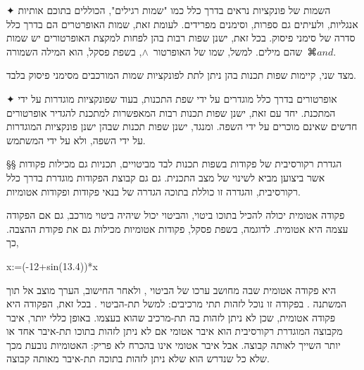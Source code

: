✦ השמות של פונקציות נראים בדרך כלל כמו "שמות רגילים", הכוללים בתוכם אותיות
אנגליות, ולעיתים גם ספרות, וסימנים מפרידים. לעומת זאת, שמות האופרטרים הם בדרך
כלל סדרה של סימני פיסוק. בכל זאת, ישנן שפות רבות בהן לפחות למקצת האופרטורים יש
שמות שהם מילים. למשל, שמו של האופרטור~$∧$, בשפת פסקל, הוא המילה
השמורה~$⌘{and}$.

מצד שני, קיימות שפות תכנות בהן ניתן לתת לפונקציות שמות המורכבים מסימני פיסוק
בלבד.

✦ אופרטורים בדרך כלל מוגדרים על ידי שפת התכנות, בעוד שפונקציות מוגדרות על ידי
המתכנת. יחד עם זאת, ישנן שפות תכנות רבות המאפשרות למתכנת להגדיר אופרטורים
חדשים שאינם מוכרים על ידי השפה. ומנגד, ישנן שפות תכנות שבהן ישנן פונקציות
המוגדרות על ידי השפה, ולא על ידי המשתמש.

§§ הגדרת רקורסיבית של פקודות בשפות תכנות
לבד מביטויים, תכניות גם מכילות פקודות אשר ביצוען מביא לשינוי של מצב התכנית. גם
גם קבוצת הפקודות מוגדרת בדרך כלל רקורסיבית, והגדרה זו כוללת בתוכה
הגדרה של בנאי פקודות ופקודות אטומיות.

פקודה אטומית יכולה להכיל בתוכו ביטוי, והביטוי יכול שיהיה ביטוי מורכב, גם אם
הפקודה עצמה היא אטומית.
לדוגמה, בשפת פסקל, פקודות אטומיות מכילות גם את פקודת ההצבה. כך,
\begin{PASCAL}
x:=(-12+sin(13.4))*x
\end{PASCAL}
היא פקודה אטומית שבה מחושב ערכו של הביטוי ,
ולאחר החישוב, הערך מוצב אל תוך המשתנה .
בפקודה זו נוכל לזהות תתי מרכיבים: למשל תת-הביטוי .
בכל זאת, הפקודה היא פקודה אטומית, שכן לא ניתן לזהות בה תת-מרכיב שהוא 
בעצמו. באופן כללי יותר, איבר מקבוצה המוגדרת רקורסיבית הוא איבר אטומי אם
לא ניתן לזהות בתוכו תת-איבר אחד או יותר השייך לאותה קבוצה. אבל איבר אטומי אינו
בהכרח לא פריק: האטומיות נובעת מכך שלא כל שנדרש הוא שלא ניתן לזהות בתוכה תת-איבר
מאותה קבוצה.

